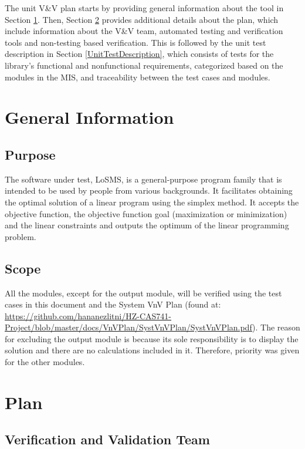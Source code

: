 \documentclass[12pt, titlepage]{article}
\newcommand{\famname}{LoSMS}
\begin{document}
The unit V\&V plan starts by providing general information about the tool in 
Section \ref{GeneralInfo}. Then, Section \ref{Plan} provides additional details 
about the plan, which include information about the V\&V team, automated 
testing and verification tools and non-testing based verification. This is 
followed by the unit test description in Section \ref{UnitTestDescription}, 
which consists of tests for the library's functional and nonfunctional 
requirements, categorized based on the modules in the MIS, and traceability 
between the test cases and modules.

\section{General Information} \label{GeneralInfo}

\subsection{Purpose}

The software under test, \famname{}, is a general-purpose program family that 
is intended to be used by people from various backgrounds. It facilitates 
obtaining the optimal solution of a linear program using the simplex method. It 
accepts the objective function, the objective function goal (maximization or 
minimization) and the linear constraints and outputs the optimum of the linear 
programming problem.

\subsection{Scope}

All the modules, except for the output module, will be verified using the test 
cases in this document and the System VnV Plan (found at: 
\url{https://github.com/hananezlitni/HZ-CAS741-Project/blob/master/docs/VnVPlan/SystVnVPlan/SystVnVPlan.pdf}).
 The reason for excluding the output module is because its sole responsibility 
 is to display the solution and there are no calculations included in it. 
 Therefore, priority was given for the other modules.

\section{Plan} \label{Plan}
	
\subsection{Verification and Validation Team}
\end{document}
